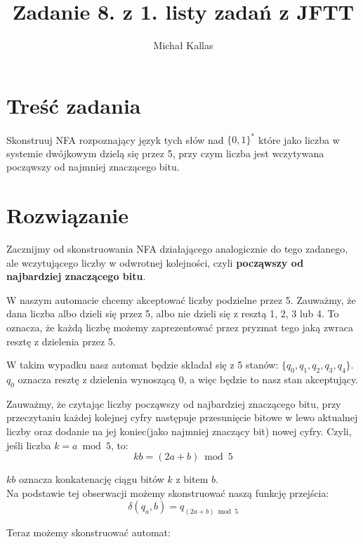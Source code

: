 \documentclass{article}
\title{Zadanie 8. z 1. listy zadań z JFTT}
\author{Michał Kallas}
\begin{document}
\maketitle

\section{Treść zadania}
Skonstruuj NFA rozpoznający język tych słów nad $\{0, 1\}^{*}$ które jako liczba w systemie dwójkowym dzielą się przez 5,
przy czym liczba jest wczytywana począwszy od najmniej znaczącego bitu.

\section{Rozwiązanie}
Zacznijmy od skonstruowania NFA działającego analogicznie do tego zadanego, ale wczytującego liczby w odwrotnej
kolejności, czyli \textbf{począwszy od najbardziej znaczącego bitu}.

W naszym automacie chcemy akceptować liczby podzielne przez 5. Zauważmy, że dana liczba albo dzieli się przez 5, albo
nie dzieli się z resztą 1, 2, 3 lub 4. To oznacza, że każdą liczbę możemy zaprezentować przez pryzmat tego jaką zwraca resztę z
dzielenia przez 5.

W takim wypadku nasz automat będzie składał się z 5 stanów: $\{q_0, q_1, q_2, q_3, q_4\}$. $q_0$
oznacza resztę z dzielenia wynoszącą 0, a więc będzie to nasz stan akceptujący.

Zauważmy, że czytając liczby począwszy od najbardziej znaczącego bitu, przy przeczytaniu każdej kolejnej cyfry
następuje przesunięcie bitowe w lewo aktualnej liczby oraz dodanie na jej koniec(jako najmniej znaczący bit) nowej
cyfry. Czyli, jeśli liczba $k = a \bmod{5}$, to:
$$kb = (2a + b) \bmod{5}$$

$kb$ oznacza konkatenację ciągu bitów $k$ z bitem $b$.\\

Na podstawie tej obserwacji możemy skonstruować naszą funkcję przejścia:
$$\delta(q_a, b) = q_{(2a + b) \bmod{5}}$$

Teraz możemy skonstruować automat:
\end{document}
